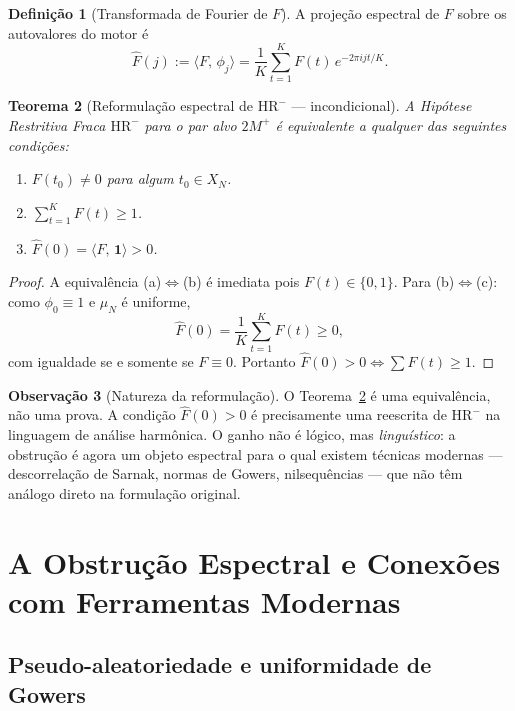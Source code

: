 \documentclass[12pt,a4paper]{article}
\newtheorem{theorem}{Teorema}[section]
\theoremstyle{definition}
\newtheorem{definition}[theorem]{Definição}
\newtheorem{remark}[theorem]{Observação}
\newcommand{\HRm}{\mathrm{HR}^{-}}
\newcommand{\ip}[2]{\langle #1,\, #2 \rangle}
\begin{document}
	\begin{definition}[Transformada de Fourier de $F$]
		A projeção espectral de $F$ sobre os autovalores do motor é
		\[
		\widehat{F}(j) := \ip{F}{\phi_j} = \frac{1}{K}\sum_{t=1}^{K}
		F(t)\,e^{-2\pi i j t/K}.
		\]
	\end{definition}
	
	\begin{theorem}[Reformulação espectral de $\HRm$ — incondicional]
		\label{thm:reformulacao}
		A Hipótese Restritiva Fraca $\HRm$ para o par alvo $2M^+$ é
		equivalente a qualquer das seguintes condições:
		\begin{enumerate}[label=(\alph*)]
			\item $F(t_0) \neq 0$ para algum $t_0 \in X_N$.
			\item $\displaystyle\sum_{t=1}^{K} F(t) \geq 1$.
			\item $\widehat{F}(0) = \ip{F}{\mathbf{1}} > 0$.
		\end{enumerate}
	\end{theorem}
	
	\begin{proof}
		A equivalência (a)$\Leftrightarrow$(b) é imediata pois
		$F(t) \in \{0,1\}$. Para (b)$\Leftrightarrow$(c): como
		$\phi_0 \equiv 1$ e $\mu_N$ é uniforme,
		\[
		\widehat{F}(0) = \frac{1}{K}\sum_{t=1}^K F(t) \geq 0,
		\]
		com igualdade se e somente se $F \equiv 0$. Portanto
		$\widehat{F}(0) > 0 \Leftrightarrow \sum F(t) \geq 1$.
	\end{proof}
	
	\begin{remark}[Natureza da reformulação]
		\label{rem:tautologia}
		O Teorema~\ref{thm:reformulacao} é uma equivalência, não uma
		prova. A condição $\widehat{F}(0) > 0$ é precisamente uma
		reescrita de $\HRm$ na linguagem de análise harmônica. O ganho
		não é lógico, mas \emph{linguístico}: a obstrução é agora um
		objeto espectral para o qual existem técnicas modernas —
		descorrelação de Sarnak, normas de Gowers, nilsequências — que
		não têm análogo direto na formulação original.
	\end{remark}
	
	\section{A Obstrução Espectral e Conexões com Ferramentas Modernas}
	\label{sec:obstrucao}
	
	\subsection{Pseudo-aleatoriedade e uniformidade de Gowers}
	
\end{document}
